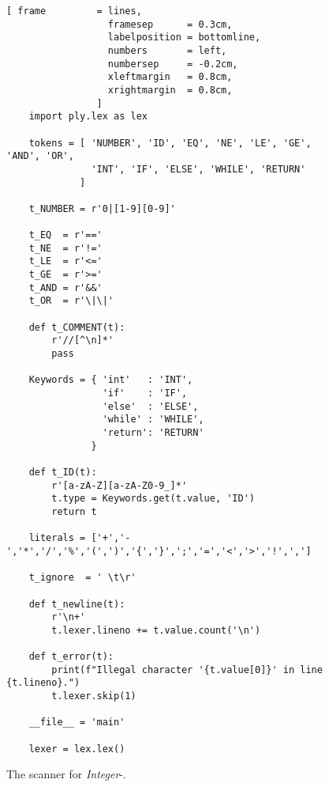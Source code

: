 \begin{figure}[!ht]
\centering
\begin{Verbatim}[ frame         = lines, 
                  framesep      = 0.3cm, 
                  labelposition = bottomline,
                  numbers       = left,
                  numbersep     = -0.2cm,
                  xleftmargin   = 0.8cm,
                  xrightmargin  = 0.8cm,
                ]
    import ply.lex as lex
    
    tokens = [ 'NUMBER', 'ID', 'EQ', 'NE', 'LE', 'GE', 'AND', 'OR',
               'INT', 'IF', 'ELSE', 'WHILE', 'RETURN'
             ]
    
    t_NUMBER = r'0|[1-9][0-9]'
    
    t_EQ  = r'=='
    t_NE  = r'!='
    t_LE  = r'<='
    t_GE  = r'>='
    t_AND = r'&&'
    t_OR  = r'\|\|'
    
    def t_COMMENT(t):
        r'//[^\n]*'
        pass

    Keywords = { 'int'   : 'INT', 
                 'if'    : 'IF',
                 'else'  : 'ELSE', 
                 'while' : 'WHILE', 
                 'return': 'RETURN'
               }
    
    def t_ID(t):
        r'[a-zA-Z][a-zA-Z0-9_]*'
        t.type = Keywords.get(t.value, 'ID')
        return t
    
    literals = ['+','-','*','/','%','(',')','{','}',';','=','<','>','!',',']
    
    t_ignore  = ' \t\r'
    
    def t_newline(t):
        r'\n+'
        t.lexer.lineno += t.value.count('\n')

    def t_error(t):
        print(f"Illegal character '{t.value[0]}' in line {t.lineno}.")
        t.lexer.skip(1)
    
    __file__ = 'main'
    
    lexer = lex.lex()
\end{Verbatim}
\vspace*{-0.3cm}
\caption{The scanner for \textsl{Integer}-.}
\label{fig:Compiler.ipynb:lex}
\end{figure}

